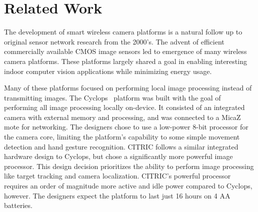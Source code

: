 \section{Related Work}
The development of smart wireless camera platforms is a natural follow up to original sensor network research from the 2000's. The advent of efficient commercially available CMOS image sensors led to emergence of many wireless camera platforms. These platforms largely shared a goal in enabling interesting indoor computer vision applications while minimizing energy usage.

Many of these platforms focused on performing local image processing instead of transmitting images.
The Cyclops~\cite{rahimi2005cyclops} platform was built with the goal of performing all image processing locally on-device. It consisted of an integrated camera with external memory and processing, and was connected to a MicaZ mote for networking. The designers chose to use a low-power 8-bit processor for the camera core, limiting the platform's capability to some simple movement detection and hand gesture recognition.
CITRIC \cite{chen2008citric} follows a similar integrated hardware design to Cyclops, but chose a significantly more powerful image processor. This design decision prioritizes the ability to perform image processing like target tracking and camera localization. CITRIC's powerful processor requires an order of magnitude more active and idle power compared to Cyclops, however. The designers expect the platform to last just 16 hours on 4 AA batteries. 


